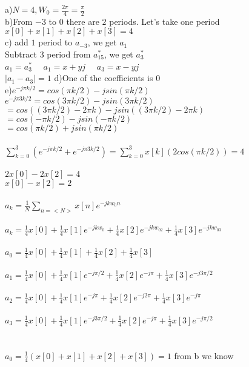 \documentclass[10pt,a4paper, margin=1in]{article}
\begin{document}
\begin{enumerate}
a)$N=4, W_0=\frac{2{\pi}}{4}=\frac{{\pi}}{2}$ \\
b)From  $-3$ to $0$ there are $2$ periods. Let's take one period\\
$x[0]+x[1]+x[2]+x[3]=4$\\
c) add $1$ period to $a_{-3}$, we get $a_1$\\
Subtract $3$ period from $a_{15}^*$, we get $a_3^*$\\
$a_1=a_3^*$ \ \ $a_1=x+yj$ \ \ $a_3=x-yj$ \\
$|a_1-a_3|=1$ 
d)One of the coefficients is $0$\\
e)$e^{-j{\pi}k/2}=cos({\pi}k/2)-jsin({\pi}k/2)$\\
$e^{-j{\pi}3k/2}=cos(3{\pi}k/2)-jsin(3{\pi}k/2)$\\
$=cos((3{\pi}k/2)-2{\pi}k)-jsin((3{\pi}k/2)-2{\pi}k)$\\
$=cos(-{\pi}k/2)-jsin(-{\pi}k/2)$\\
$=cos({\pi}k/2)+jsin({\pi}k/2)$\\ \\
$\sum_{k=0}^{3}(e^{-j{\pi}k/2}+e^{-j{\pi}3k/2})=\sum_{k=0}^{3}x[k](2cos({\pi}k/2))=4$\\ \\
$2x[0]-2x[2]=4$\\
$x[0]-x[2]=2$\\ \\
$a_k=\frac{1}{N}\sum_{n=<N>}^{}x[n]e^{-jkw_0n}$\\ \\
$a_k=\frac{1}{4}x[0]+\frac{1}{4}x[1]e^{-jkw_0}+\frac{1}{4}x[2]e^{-jkw_02}+\frac{1}{4}x[3]e^{-jkw_03}$\\ \\
$a_0=\frac{1}{4}x[0]+\frac{1}{4}x[1]+\frac{1}{4}x[2]+\frac{1}{4}x[3]$\\ \\
$a_1=\frac{1}{4}x[0]+\frac{1}{4}x[1]e^{-j{\pi}/2}+\frac{1}{4}x[2]e^{-j{\pi}}+\frac{1}{4}x[3]e^{-j3{\pi}/2}$\\ \\
$a_2=\frac{1}{4}x[0]+\frac{1}{4}x[1]e^{-j{\pi}}+\frac{1}{4}x[2]e^{-j2{\pi}}+\frac{1}{4}x[3]e^{-j{\pi}}$\\ \\
$a_3=\frac{1}{4}x[0]+\frac{1}{4}x[1]e^{-j3{\pi}/2}+\frac{1}{4}x[2]e^{-j{\pi}}+\frac{1}{4}x[3]e^{-j{\pi}/2}$\\ \\ \\
$a_0=\frac{1}{4}(x[0]+x[1]+x[2]+x[3])=1$ from b we know\\

\end{enumerate}
\end{document}
